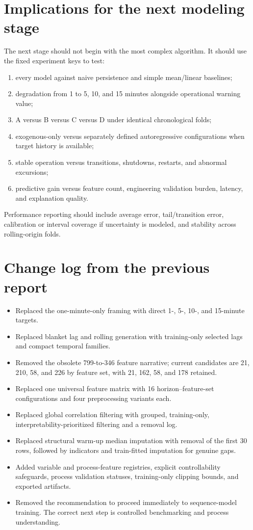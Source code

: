 \documentclass[10pt,a4paper]{article}
\begin{document}
\section{Implications for the next modeling stage}
The next stage should not begin with the most complex algorithm. It should use the fixed experiment keys to test:
\begin{enumerate}
\item every model against naive persistence and simple mean/linear baselines;
\item degradation from 1 to 5, 10, and 15 minutes alongside operational warning value;
\item A versus B versus C versus D under identical chronological folds;
\item exogenous-only versus separately defined autoregressive configurations when target history is available;
\item stable operation versus transitions, shutdowns, restarts, and abnormal excursions;
\item predictive gain versus feature count, engineering validation burden, latency, and explanation quality.
\end{enumerate}
Performance reporting should include average error, tail/transition error, calibration or interval coverage if uncertainty is modeled, and stability across rolling-origin folds.

\section{Change log from the previous report}
\begin{itemize}
\item Replaced the one-minute-only framing with direct 1-, 5-, 10-, and 15-minute targets.
\item Replaced blanket lag and rolling generation with training-only selected lags and compact temporal families.
\item Removed the obsolete 799-to-346 feature narrative; current candidates are 21, 210, 58, and 226 by feature set, with 21, 162, 58, and 178 retained.
\item Replaced one universal feature matrix with 16 horizon--feature-set configurations and four preprocessing variants each.
\item Replaced global correlation filtering with grouped, training-only, interpretability-prioritized filtering and a removal log.
\item Replaced structural warm-up median imputation with removal of the first 30 rows, followed by indicators and train-fitted imputation for genuine gaps.
\item Added variable and process-feature registries, explicit controllability safeguards, process validation statuses, training-only clipping bounds, and exported artifacts.
\item Removed the recommendation to proceed immediately to sequence-model training. The correct next step is controlled benchmarking and process understanding.
\end{itemize}
\end{document}
